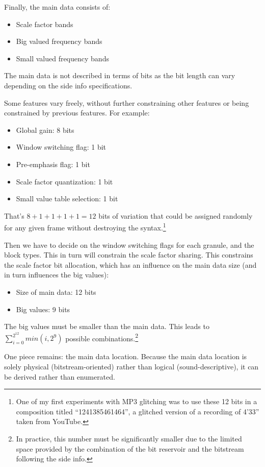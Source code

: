 \documentclass{thesis}
\begin{document}
	Finally, the main data consists of:
	
\begin{itemize}
	\item Scale factor bands
	\item Big valued frequency bands
	\item Small valued frequency bands
\end{itemize}

	The main data is not described in terms of bits as the bit length can vary depending on the side info specifications.

	Some features vary freely, without further constraining other features or being constrained by previous features. For example:

\begin{itemize}
	\item Global gain: 8 bits
	\item Window switching flag: 1 bit
	\item Pre-emphasis flag: 1 bit
	\item Scale factor quantization: 1 bit
	\item Small value table selection: 1 bit
\end{itemize}

	That's $8+1+1+1+1=12$ bits of variation that could be assigned randomly for any given frame without destroying the syntax.\footnote{One of my first experiments with MP3 glitching was to use these 12 bits in a composition titled ``1241385461464'', a glitched version of a recording of 4'33'' taken from YouTube.}
	
	Then we have to decide on the window switching flags for each granule, and the block types. This in turn will constrain the scale factor sharing. This constrains the scale factor bit allocation, which has an influence on the main data size (and in turn influences the big values):
	
\begin{itemize}
	\item Size of main data: 12 bits
	\item Big values: 9 bits
\end{itemize}

	The big values must be smaller than the main data. This leads to $\sum_{i=0}^{2^{12}} min(i,2^9)$ possible combinations.\footnote{In practice, this number must be significantly smaller due to the limited space provided by the combination of the bit reservoir and the bitstream following the side info.}
	
	One piece remains: the main data location. Because the main data location is solely physical (bitstream-oriented) rather than logical (sound-descriptive), it can be derived rather than enumerated.
\end{document}
